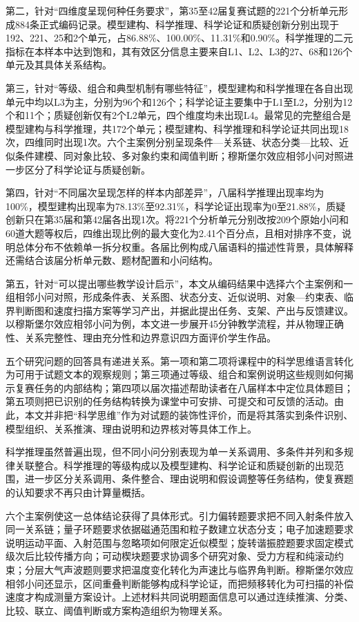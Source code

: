 \documentclass[
  12pt,
  a4paper,twoside,openany]{ctexbook}
\begin{document}
第二，针对``四维度呈现何种任务要求''，第35至42届复赛试题的221个分析单元形成884条正式编码记录。模型建构、科学推理、科学论证和质疑创新分别出现于192、221、25和2个单元，占86.88\%、100.00\%、11.31\%和0.90\%。科学推理的二元指标在本样本中达到饱和，其有效区分信息主要来自L1、L2、L3的27、68和126个单元及其具体关系结构。

第三，针对``等级、组合和典型机制有哪些特征''，模型建构和科学推理在各自出现单元中均以L3为主，分别为96个和126个；科学论证主要集中于L1至L2，分别为12个和11个；质疑创新仅有2个L2单元，四个维度均未出现L4。最常见的完整组合是模型建构与科学推理，共172个单元；模型建构、科学推理和科学论证共同出现18次，四维同时出现1次。六个主案例分别呈现条件---关系链、状态分类---比较、近似条件建模、同对象比较、多对象约束和阈值判断；穆斯堡尔效应相邻小问对照进一步区分了科学论证与质疑创新。

第四，针对``不同届次呈现怎样的样本内部差异''，八届科学推理出现率均为100\%，模型建构出现率为78.13\%至92.31\%，科学论证出现率为0至21.88\%，质疑创新只在第35届和第42届各出现1次。将221个分析单元分别改按209个原始小问和60道大题等权后，四维出现比例的最大变化为2.41个百分点，且相对排序不变，说明总体分布不依赖单一拆分权重。各届比例构成八届语料的描述性背景，具体解释还需结合该届分析单元数、题材配置和小问结构。

第五，针对``可以提出哪些教学设计启示''，本文从编码结果中选择六个主案例和一组相邻小问对照，形成条件表、关系图、状态分支、近似说明、对象---约束表、临界判断图和速度扫描方案等学习产出，并据此提出任务、支架、产出与反馈建议。以穆斯堡尔效应相邻小问为例，本文进一步展开45分钟教学流程，并从物理正确性、关系完整性、理由充分性和边界意识四方面评价学生作品。

五个研究问题的回答具有递进关系。第一项和第二项将课程中的科学思维语言转化为可用于试题文本的观察规则；第三项通过等级、组合和案例说明这些规则如何揭示复赛任务的内部结构；第四项以届次描述帮助读者在八届样本中定位具体题目；第五项则把已识别的任务结构转换为课堂中可安排、可提交和可反馈的活动。由此，本文并非把``科学思维''作为对试题的装饰性评价，而是将其落实到条件识别、模型组织、关系推演、理由说明和边界核对等具体工作上。

科学推理虽然普遍出现，但不同小问分别表现为单一关系调用、多条件并列和多规律关联整合。科学推理的等级构成以及模型建构、科学论证和质疑创新的出现范围，进一步区分关系调用、条件整合、理由说明和假设调整等任务结构，使复赛题的认知要求不再只由计算量概括。

六个主案例使这一总体结论获得了具体形式。引力偏转题要求把不同入射条件放入同一关系链；量子环题要求依据磁通范围和粒子数建立状态分支；电子加速题要求说明运动平面、入射范围与忽略项如何限定近似模型；旋转谐振腔题要求固定模式级次后比较传播方向；可动楔块题要求协调多个研究对象、受力方程和纯滚动约束；分层大气声波题则要求把温度变化转化为声速比与临界角判断。穆斯堡尔效应相邻小问还显示，区间重叠判断能够构成科学论证，而把频移转化为可扫描的补偿速度才构成测量方案设计。上述材料共同说明题面信息可以通过连续推演、分类、比较、联立、阈值判断或方案构造组织为物理关系。
\end{document}
